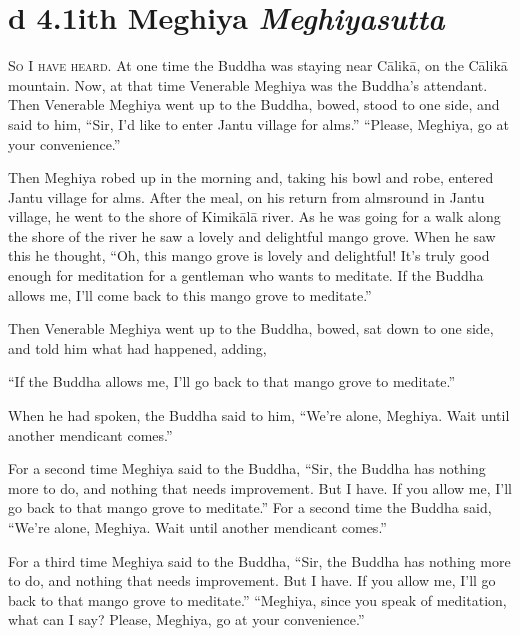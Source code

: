 \documentclass[12pt,openany]{book}%
\newcommand*{\suttatitleacronym}[1]{\smaller[2]{#1}\vspace*{.3em}}
\newcommand*{\suttatitletranslation}[1]{\linebreak{#1}}
\newcommand*{\suttatitleroot}[1]{\linebreak\smaller[2]\itshape{#1}}
\newcommand*{\tocacronym}[1]{\hspace*{-3.3em}{#1}\quad}
\newcommand*{\toctranslation}[1]{#1}
\newcommand*{\tocroot}[1]{(\textit{#1})}
\newcommand*{\scevam}[1]{\textsc{#1}}
\begin{document}
%
\section*{{\suttatitleacronym Ud 4.1}{\suttatitletranslation With Meghiya }{\suttatitleroot Meghiyasutta}}
\addcontentsline{toc}{section}{\tocacronym{Ud 4.1} \toctranslation{With Meghiya } \tocroot{Meghiyasutta}}

\scevam{So I have heard. }At one time the Buddha was staying near \textsanskrit{Cālikā}, on the \textsanskrit{Cālikā} mountain. Now, at that time Venerable Meghiya was the Buddha’s attendant. Then Venerable Meghiya went up to the Buddha, bowed, stood to one side, and said to him, “Sir, I’d like to enter Jantu village for alms.” “Please, Meghiya, go at your convenience.” 

Then Meghiya robed up in the morning and, taking his bowl and robe, entered Jantu village for alms. After the meal, on his return from almsround in Jantu village, he went to the shore of \textsanskrit{Kimikālā} river. As he was going for a walk along the shore of the river he saw a lovely and delightful mango grove. When he saw this he thought, “Oh, this mango grove is lovely and delightful! It’s truly good enough for meditation for a gentleman who wants to meditate. If the Buddha allows me, I’ll come back to this mango grove to meditate.” 

Then Venerable Meghiya went up to the Buddha, bowed, sat down to one side, and told him what had happened, adding, 

“If the Buddha allows me, I’ll go back to that mango grove to meditate.” 

When he had spoken, the Buddha said to him, “We’re alone, Meghiya. Wait until another mendicant comes.” 

For a second time Meghiya said to the Buddha, “Sir, the Buddha has nothing more to do, and nothing that needs improvement. But I have. If you allow me, I’ll go back to that mango grove to meditate.” For a second time the Buddha said, “We’re alone, Meghiya. Wait until another mendicant comes.” 

For a third time Meghiya said to the Buddha, “Sir, the Buddha has nothing more to do, and nothing that needs improvement. But I have. If you allow me, I’ll go back to that mango grove to meditate.” “Meghiya, since you speak of meditation, what can I say? Please, Meghiya, go at your convenience.” 
\end{document}
